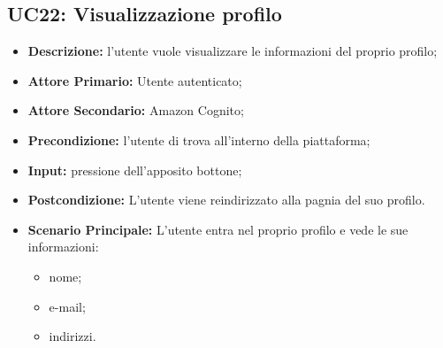         \subsection{UC22: Visualizzazione profilo}
        \label{sec:UC22}
        \begin{itemize}
            \item \textbf{Descrizione:} l'utente vuole visualizzare le informazioni del proprio profilo;
            \item \textbf{Attore Primario:} Utente autenticato;
            \item \textbf{Attore Secondario:} Amazon Cognito;
            \item \textbf{Precondizione:} l'utente di trova all'interno della piattaforma;
            \item \textbf{Input:} pressione dell'apposito bottone;
            \item \textbf{Postcondizione:} L'utente viene reindirizzato alla pagnia del suo profilo.
            \item \textbf{Scenario Principale:} L'utente entra nel proprio profilo e vede le sue informazioni:
            \begin{itemize}
                \item nome;
                \item e-mail;
                \item indirizzi.
            \end{itemize}
        \end{itemize}

